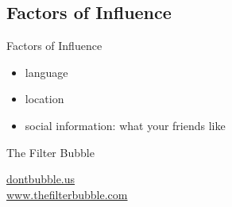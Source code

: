 \subsection{Factors of Influence}
\begin{frame}{Factors of Influence}
	\begin{itemize}[<+->]
		\item language
		\item location
		\item social information: what your friends like
	\end{itemize}
\end{frame}

\begin{frame}{The Filter Bubble}
	\begin{center}
		\href{http://dontbubble.us}{dontbubble.us}\\
		\href{http://www.thefilterbubble.com/}{www.thefilterbubble.com}
	\end{center}
\end{frame}

